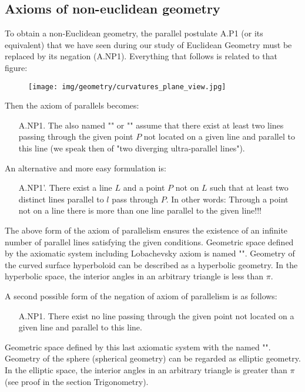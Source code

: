 	\subsection{Axioms of non-euclidean geometry}
	To obtain a non-Euclidean geometry, the parallel postulate A.P1 (or its equivalent) that we have seen during our study of Euclidean Geometry must be replaced by its negation (A.NP1). Everything that follows is related to that figure:
	\begin{figure}[H]
		\centering
		\texttt{[image: img/geometry/curvatures\_plane\_view.jpg]}
	\end{figure}	
	Then the axiom of parallels becomes:
	\begin{enumerate}
		\item[A.NP1.] The also named "" or "" assume that there exist at least two lines passing through the given point $P$ not located on a given line and parallel to this line (we speak then of "two diverging ultra-parallel lines").
	\end{enumerate}
	An alternative and more easy formulation is:
	\begin{enumerate}
		\item[A.NP1'.] There exist a line $L$ and a point $P$ not on $L$ such that at least two distinct lines parallel to $l$ pass through $P$. In other words:  Through a point not on a line there is more than one line parallel to the given line!!!
	\end{enumerate}
	The above form of the axiom of parallelism ensures the existence of an infinite number of parallel lines satisfying the given conditions. Geometric space defined by the axiomatic system including Lobachevsky axiom is named "". Geometry of the curved surface hyperboloid can be described as a hyperbolic geometry. In the hyperbolic space, the interior angles in an arbitrary triangle is less than $\pi$.
	
	A second possible form of the negation of axiom of parallelism is as follows:
	\begin{enumerate}
		\item[A.NP1.] There exist no line passing through the given point not located on a given line and parallel to this line.
	\end{enumerate}
	Geometric space defined by this last axiomatic system with the named "". Geometry of the sphere (spherical geometry) can be regarded as elliptic geometry. In the elliptic space, the interior angles in an arbitrary triangle is greater than $\pi$ (see proof in the section Trigonometry).
	
